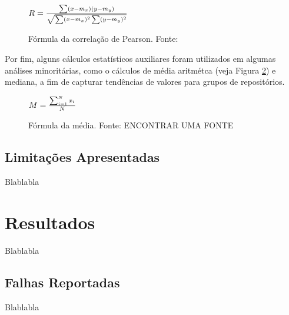 \documentclass[11.5pt]{article}
\begin{document}
\begin{figure}[ht]
\caption{Fórmula da correlação de Pearson. Fonte: \cite{scipy}}
\label{fig:formulaCorrelacao}
\begin{center}
    $R = {\sum(x - m_x)(y - m_y) \over \sqrt{\sum(x - m_x)^2 \sum(y - m_y)^2}}$
\end{center}
\end{figure}

Por fim, alguns cálculos estatísticos auxiliares foram utilizados em algumas análises minoritárias,
como o cálculos de média aritmétca (veja Figura \ref{fig:formulaMedia}) e mediana, a fim de capturar
tendências de valores para grupos de repositórios.

\begin{figure}[ht]
\caption{Fórmula da média. Fonte: ENCONTRAR UMA FONTE}
\label{fig:formulaMedia}
\begin{center}
    $M = {\sum_{i=1}^{N} x_i \over N}$
\end{center}
\end{figure}


\subsection{Limitações Apresentadas}
Blablabla




\section{Resultados} \label{sec:resultados}
Blablabla


\subsection{Falhas Reportadas}
Blablabla

\end{document}
